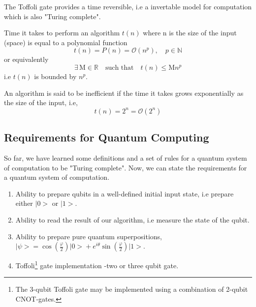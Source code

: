 \documentclass[10pt]{article}
\numberwithin{equation}{section}
\theoremstyle{defi}
\begin{document}
The Toffoli gate provides a time reversible, i.e a invertable model for computation which is also "Turing complete". 

\begin{definitionii}[Efficiency]
  Time it takes to perform an algorithm $t(n)$ where n is the size of the input (space) is equal to a polynomial function
  \begin{equation*}
    t(n) = P(n) = \mathcal{O}(n^p), \quad p \in \mathbb{N}
  \end{equation*}
  or equivalently
\begin{equation*}
  \exists\, \text{M} \in \mathbb{R} \quad \text{such that} \quad t(n) \leq \text{M}n^p
\end{equation*}
  i.e $t(n)$ is bounded by $n^p$.
\end{definitionii}
\begin{definitionii}[Inefficient]
An algorithm is said to be inefficient if the time it takes grows exponentially as the size of the input, i.e,
\begin{equation*}
  t(n) = 2^n = \mathcal{O}(2^n)
\end{equation*}
\end{definitionii}

\subsection{Requirements for Quantum Computing}
So far, we have learned some definitions and a set of rules for a quantum system of computation to be "Turing complete". Now, we can state the requirements for a quantum system of computation.

\begin{enumerate}
\item Ability to prepare qubits in a well-defined initial input state, i.e  prepare either $\big|0\big>$ or $\big|1\big>$.
\item Ability to read the result of our algorithm, i.e measure the state of the qubit.
  \item Ability to prepare pure quantum superpositions, $\big|\psi\big> = \cos\left(\frac{\varphi}{2}\right)\big|0\big> + e^{i\theta}\sin\left(\frac{\varphi}{2}\right)\big|1\big>$.
  \item Toffoli\footnote{The 3-qubit Toffoli gate may be implemented using a combination of 2-qubit CNOT-gates.} gate implementation -two or three qubit gate.
\end{enumerate}
\end{document}

